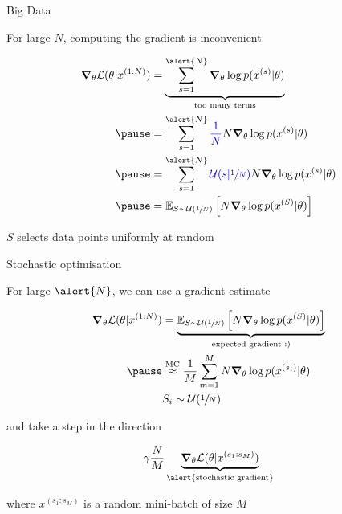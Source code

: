 \documentclass[14pt]{beamer}
\begin{document}
\begin{frame}{Big Data}

For large \alert{$N$}, computing the gradient is inconvenient
\begin{small}
\begin{equation*}
\begin{aligned}
\grad_\theta \mathcal L(\theta|x^{(1:N)}) &=   \underbrace{\sum_{s=1}^{\alert{N}} \grad_\theta \log p(x^{(s)}|\theta)}_{\text{too many terms}} \\ \pause
&=   \sum_{s=1}^{\alert{N}} \textcolor{blue}{\frac{1}{ N} } N \grad_\theta \log p(x^{(s)}|\theta) \\ \pause
&= \sum_{s=1}^{\alert{N}}\textcolor{blue}{\mathcal U(s|\sfrac{1}{N})}  N \grad_\theta \log p(x^{(s)}|\theta) \\ \pause
&= \mathbb E_{S\sim \mathcal U(\sfrac{1}{N})}\left[ N \grad_\theta  \log p(x^{(S)}|\theta)\right]
\end{aligned}
\end{equation*} 
\end{small}

$S$ selects data points uniformly at random



\end{frame}

\begin{frame}{Stochastic optimisation}


For large $\alert{N}$, we can use a gradient estimate 
\begin{small}
\begin{equation*}
\begin{aligned}
\grad_\theta \mathcal L(\theta|x^{(1:N)}) 
 &=  \underbrace{\mathbb E_{S\sim \mathcal U(\sfrac{1}{N})}\left[ N \grad_\theta  \log p(x^{(S)}|\theta)\right]}_{\text{expected gradient :)}} \\ \pause
 &\overset{\text{MC}}{\approx} \frac{1}{M} \sum_{m=1}^M N  \grad_\theta \log p(x^{(s_i)}|\theta) \\
 &S_i \sim \mathcal U(\sfrac{1}{N})
\end{aligned}
\end{equation*}
\end{small}  \pause
and take a step in the direction
\begin{small}
\begin{equation*}
\gamma \frac{N}{M} \underbrace{\grad_\theta \mathcal L(\theta|x^{(s_1:s_M)})}_{\text{\alert{stochastic gradient}}}
\end{equation*}
\end{small}
where $x^{(s_1:s_M)}$ is a random mini-batch of size $M$


\end{frame}
\end{document}
